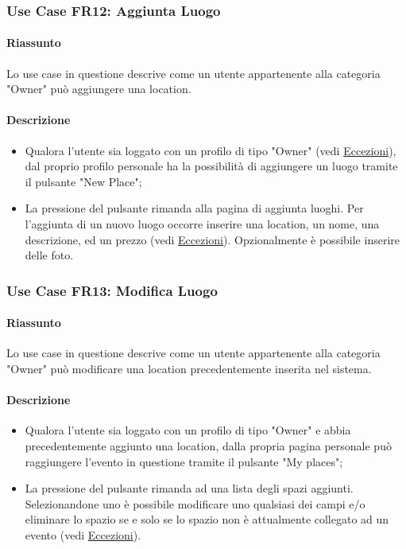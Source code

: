 \documentclass[9pt]{extarticle}
\begin{document}
\subsubsection*{Use Case FR12: Aggiunta Luogo}

\paragraph{Riassunto}

Lo use case in questione descrive come un utente appartenente alla categoria "Owner" può aggiungere una location.

\paragraph{Descrizione}

\begin{itemize}
	\item Qualora l'utente sia loggato con un profilo di tipo "Owner" (vedi \hyperref[Eccezioni-FR12-13]{Eccezioni}), dal proprio profilo personale ha la possibilità di aggiungere un luogo tramite il pulsante "New Place";
	\item La pressione del pulsante rimanda alla pagina di aggiunta luoghi. Per l'aggiunta di un nuovo luogo occorre inserire una location, un nome, una descrizione, ed un prezzo (vedi \hyperref[Eccezioni-FR12-13]{Eccezioni}). Opzionalmente è possibile inserire delle foto.
\end{itemize}

\subsubsection*{Use Case FR13: Modifica Luogo}

\paragraph{Riassunto}

Lo use case in questione descrive come un utente appartenente alla categoria "Owner" può modificare una location precedentemente inserita nel sistema.

\paragraph{Descrizione}

\begin{itemize}
	\item Qualora l'utente sia loggato con un profilo di tipo "Owner" e abbia precedentemente aggiunto una location, dalla propria pagina personale può raggiungere l'evento in questione tramite il pulsante "My places";
	\item La pressione del pulsante rimanda ad una lista degli spazi aggiunti. Selezionandone uno è possibile modificare uno qualsiasi dei campi e/o eliminare lo spazio se e solo se lo spazio non è attualmente collegato ad un evento (vedi \hyperref[Eccezioni-FR12-13]{Eccezioni}).
\end{itemize}
\end{document}

